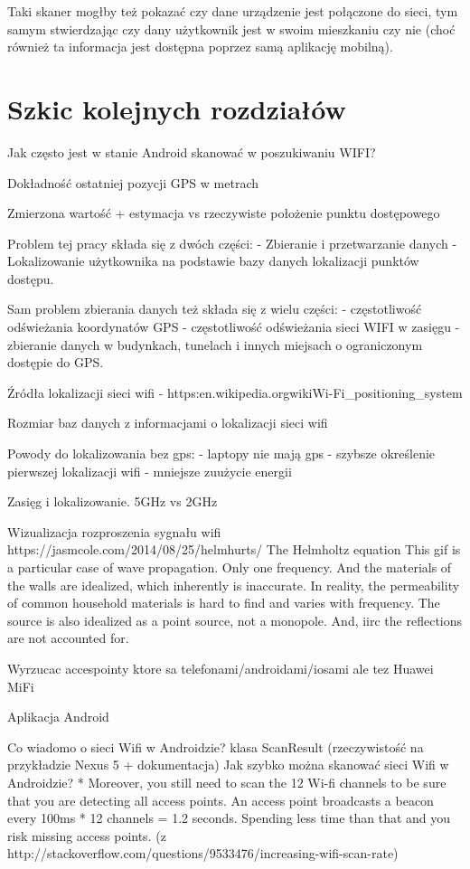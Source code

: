 Taki skaner mogłby też pokazać czy dane urządzenie jest połączone do sieci, tym samym stwierdzając czy dany użytkownik jest w swoim mieszkaniu czy nie (choć również ta informacja jest dostępna poprzez samą aplikację mobilną).


\chapter{Szkic kolejnych rozdziałów}
Jak często jest w stanie Android skanować w poszukiwaniu WIFI?

Dokładność ostatniej pozycji GPS w metrach

Zmierzona wartość + estymacja vs rzeczywiste położenie punktu dostępowego

Problem tej pracy składa się z dwóch części:
 - Zbieranie i przetwarzanie danych
 - Lokalizowanie użytkownika na podstawie bazy danych lokalizacji punktów dostępu.
 
Sam problem zbierania danych też składa się z wielu części:
 - częstotliwość odświeżania koordynatów GPS
 - częstotliwość odświeżania sieci WIFI w zasięgu
 - zbieranie danych w budynkach, tunelach i innych miejsach o ograniczonym dostępie do GPS.
 

Źródła lokalizacji sieci wifi - https:\/\/en.wikipedia.org\/wiki\/Wi-Fi\_positioning\_system

Rozmiar baz danych z informacjami o lokalizacji sieci wifi

Powody do lokalizowania bez gps:
 - laptopy nie mają gps
 - szybsze określenie pierwszej lokalizacji wifi
 - mniejsze zuużycie energii
 
Zasięg i lokalizowanie. 5GHz vs 2GHz

Wizualizacja rozproszenia sygnału wifi
https://jasmcole.com/2014/08/25/helmhurts/
The Helmholtz equation
This gif is a particular case of wave propagation. Only one frequency. And the materials of the walls are idealized, which inherently is inaccurate. In reality, the permeability of common household materials is hard to find and varies with frequency. The source is also idealized as a point source, not a monopole. And, iirc the reflections are not accounted for. 


Wyrzucac accespointy ktore sa telefonami/androidami/iosami ale tez Huawei MiFi

Aplikacja Android

    Co wiadomo o sieci Wifi w Androidzie? klasa ScanResult (rzeczywistość na przykładzie Nexus 5 + dokumentacja)
    Jak szybko można skanować sieci Wifi w Androidzie? * Moreover, you still need to scan the 12 Wi-fi channels to be sure that you are detecting all access points. An access point broadcasts a beacon every 100ms * 12 channels = 1.2 seconds. Spending less time than that and you risk missing access points. (z http://stackoverflow.com/questions/9533476/increasing-wifi-scan-rate)
    
